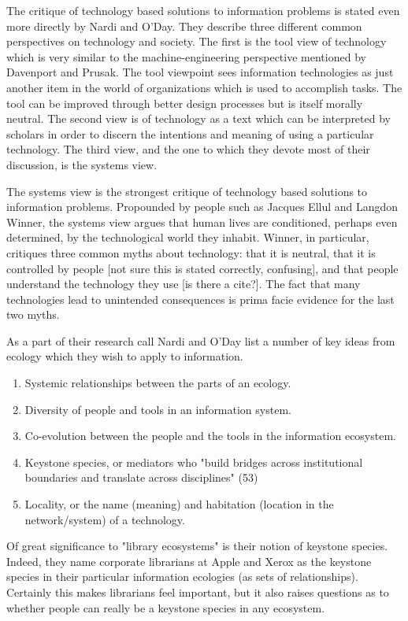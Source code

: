 The critique of technology based solutions to information problems is stated even more directly by Nardi and O'Day. They describe three different common perspectives on technology and society. The first is the tool view of technology which is very similar to the machine-engineering perspective mentioned by Davenport and Prusak. The tool viewpoint sees information technologies as just another item in the world of organizations which is used to accomplish tasks. The tool can be improved through better design processes but is itself morally neutral. The second view is of technology as a text which can be interpreted by scholars in order to discern the intentions and meaning of using a particular technology. The third view, and the one to which they devote most of their discussion, is the systems view.

The systems view is the strongest critique of technology based solutions to information problems. Propounded by people such as Jacques Ellul and Langdon Winner, the systems view argues that human lives are conditioned, perhaps even determined, by the technological world they inhabit. Winner, in particular, critiques three common myths about technology: that it is neutral, that it is controlled by people [not sure this is stated correctly, confusing], and that people understand the technology they use [is there a cite?]. The fact that many technologies lead to unintended consequences is prima facie evidence for the last two myths.

As a part of their research call Nardi and O'Day list a number of key ideas from ecology which they wish to apply to information.

\begin{enumerate}
\item Systemic relationships between the parts of an ecology.
\item Diversity of people and tools in an information system.
\item Co-evolution between the people and the tools in the information ecosystem.
\item Keystone species, or mediators who "build bridges across institutional boundaries and translate across disciplines" (53)
\item Locality, or the name (meaning) and habitation (location in the network/system) of a technology.
\end{enumerate}

Of great significance to "library ecosystems" is their notion of keystone species. Indeed, they name corporate librarians at Apple and Xerox as the keystone species in their particular information ecologies (as sets of relationships). Certainly this makes librarians feel important, but it also raises questions as to whether people can really be a keystone species in any ecosystem.

